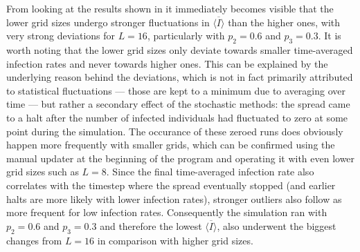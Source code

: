 From looking at the results shown in  it immediately becomes visible that the lower grid sizes undergo stronger fluctuations in $\overline{\langle I\rangle}$ than the higher ones, 
with very strong deviations for $L=16$, particularly with $p_2=0.6$ and $p_3=0.3$. It is worth noting that the lower grid sizes only deviate towards smaller time-averaged infection rates and never towards higher ones. 
This can be explained by the underlying reason behind the deviations, which is not in fact primarily attributed to statistical fluctuations --- those are kept to a minimum due to averaging over time --- but
rather a secondary effect of the stochastic methods: the spread came to a halt after the number of infected individuals had fluctuated to zero at some point during the simulation. The occurance of these zeroed runs does
obviously happen more frequently with smaller grids, which can be confirmed using the manual updater at the beginning of the program and operating it with even lower grid sizes such as $L=8$.
Since the final time-averaged infection rate also correlates with the timestep where the spread eventually stopped (and earlier halts are more likely with lower infection rates), stronger outliers also follow as more frequent 
for low infection rates. Consequently the simulation ran with $p_2=0.6$ and $p_3=0.3$ and therefore the lowest $\overline{\langle I\rangle}$, also underwent the biggest changes from $L=16$ in comparison with higher grid sizes.

